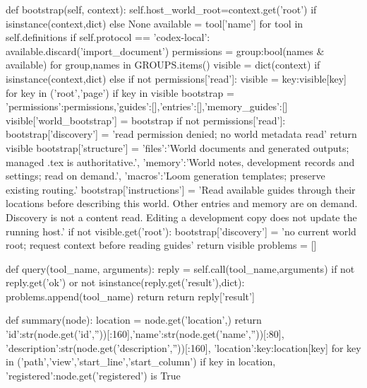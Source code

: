     def bootstrap(self, context):
        self.host_world_root=context.get('root') if isinstance(context,dict) else None
        available = {tool['name'] for tool in self.definitions}
        if self.protocol == 'codex-local':
            available.discard('import_document')
        permissions = {group:bool(names & available) for group,names in GROUPS.items()}
        visible = dict(context) if isinstance(context,dict) else {}
        if not permissions['read']:
            visible = {key:visible[key] for key in ('root','page') if key in visible}
        bootstrap = {'permissions':permissions,'guides':[],'entries':[],'memory_guides':[]}
        visible['world_bootstrap'] = bootstrap
        if not permissions['read']:
            bootstrap['discovery'] = 'read permission denied; no world metadata read'
            return visible
        bootstrap['structure'] = {'files':'World documents and generated outputs; managed .tex is authoritative.',
                                  'memory':'World notes, development records and settings; read on demand.',
                                  'macros':'Loom generation templates; preserve existing routing.'}
        bootstrap['instructions'] = 'Read available guides through their locations before describing this world. Other entries and memory are on demand. Discovery is not a content read. Editing a development copy does not update the running host.'
        if not visible.get('root'):
            bootstrap['discovery'] = 'no current world root; request context before reading guides'
            return visible
        problems = []

        def query(tool_name, arguments):
            reply = self.call(tool_name,arguments)
            if not reply.get('ok') or not isinstance(reply.get('result'),dict):
                problems.append(tool_name)
                return {}
            return reply['result']

        def summary(node):
            location = node.get('location',{})
            return {'id':str(node.get('id',''))[:160],'name':str(node.get('name',''))[:80],
                    'description':str(node.get('description',''))[:160],
                    'location':{key:location[key] for key in ('path','view','start_line','start_column') if key in location},
                    'registered':node.get('registered') is True}

